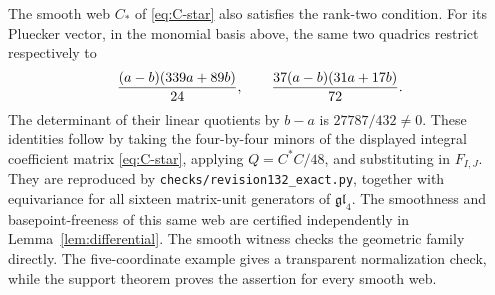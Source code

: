\begin{remark}
The smooth web \(C_*\) of \eqref{eq:C-star} also satisfies the
rank-two condition.  For its Pluecker vector, in the monomial basis
above, the same two quadrics restrict respectively to
\[
 { (a-b)(339a+89b)\over24},\qquad
 {37(a-b)(31a+17b)\over72}.
\]
The determinant of their linear quotients by \(b-a\) is
\(27787/432\ne0\).  These identities follow by taking the
four-by-four minors of the displayed integral coefficient matrix
\eqref{eq:C-star}, applying \(Q=C^*C/48\), and substituting in
\(F_{I,J}\).  They are reproduced by
\texttt{checks/revision132\_exact.py}, together with equivariance
for all sixteen matrix-unit generators of \(\mathfrak{gl}_4\).
The smoothness and basepoint-freeness of this same web are certified
independently in Lemma~\ref{lem:differential}.  The smooth witness checks the geometric family directly.  The
five-coordinate example gives a transparent normalization check,
while the support theorem proves the assertion for every smooth web.
\end{remark}

